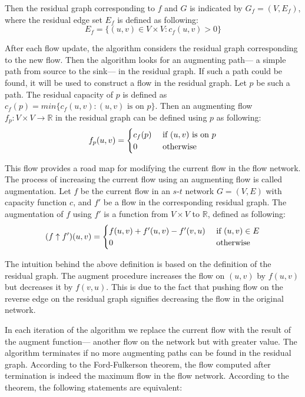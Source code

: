 \documentclass{llncs}
\begin{document}
Then the residual graph corresponding to $f$ and $G$ is indicated by $G_f = (V, E_f)$, where the residual edge set $E_f$ is defined as following:
\[ E_f = \{(u,v) \in V \times V \colon c_f (u, v) > 0\}\]

After each flow update, the algorithm considers the residual graph corresponding to the new flow. Then the algorithm looks for an augmenting path--- a simple path from source to the sink--- in the residual graph. If such a path could be found, it will be used to construct a flow in the residual graph. Let $p$ be such a path. The residual capacity of $p$ is defined as $c_f(p) = min \{c_f(u, v): \text{$(u, v)$ is on  $p$}\}$. Then an augmenting flow $f_p \colon V \times V \rightarrow \mathbb{R}$  in the residual graph can be defined using $p$ as following:
\[ f_p (u, v) = 
	\begin{cases}
	c_f(p) \hfill & \text{ if $(u, v)$ is on $p$} \\	
	0 \hfill & \text{ otherwise} \\
	\end{cases} 
\]

This flow provides a road map for modifying the current flow in the flow network. The process of increasing the current flow using an augmenting flow is called augmentation. Let $f$ be the current flow in an $s$-$t$ network $G = (V, E)$ with capacity function $c$, and $f'$ be a flow in the corresponding residual graph. The augmentation of $f$ using $f'$ is a function from $V \times V$ to $\mathbb{R}$, defined as following:
\[ (f \uparrow f') (u, v) = 
	\begin{cases}
	f (u, v) + f'(u, v) - f'(v, u) \hfill & \text{ if $(u, v) \in E$} \\	
	0 \hfill & \text{ otherwise} \\
	\end{cases} 
\]

The intuition behind the above definition is based on the definition of the residual graph. The augment procedure increases the flow on $(u, v)$ by $f ( u, v )$ but decreases it by $f (v, u)$. This is due to the fact that pushing flow on the reverse edge on the residual graph signifies decreasing the flow in the original network. 

In each iteration of the algorithm we replace the current flow with the result of the augment function--- another flow on the network but with greater value. The algorithm terminates if no more augmenting paths can be found in the residual graph. According to the Ford-Fulkerson theorem, the flow computed after termination is indeed the maximum flow in the flow network. According to the theorem, the following statements are equivalent:
\end{document}
